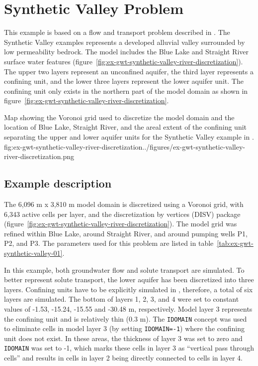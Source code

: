\section{Synthetic Valley Problem}

This example is based on a flow and transport problem described in \cite{hughes2023flopy}. The Synthetic Valley examples represents a developed alluvial valley surrounded by low permeability bedrock. The model includes the Blue Lake and Straight River surface water features (figure~\ref{fig:ex-gwt-synthetic-valley-river-discretization}). The upper two layers represent an unconfined aquifer, the third layer represents a confining unit, and the lower three layers represent the lower aquifer unit. The confining unit only exists in the northern part of the model domain as shown in figure~\ref{fig:ex-gwt-synthetic-valley-river-discretization}.

\begin{StandardFigure}{
                                     Map showing the Voronoi grid used to discretize the model domain and the location of Blue Lake, Straight River, and the areal extent of the confining unit separating the upper and lower aquifer units for the Synthetic Valley example in \cite{hughes2023flopy}.
                                     }{fig:ex-gwt-synthetic-valley-river-discretization}{../figures/ex-gwt-synthetic-valley-river-discretization.png}
\end{StandardFigure}                                 

\subsection{Example description}

The 6,096 m x 3,810 m model domain is discretized using a Voronoi grid, with 6,343 active cells per layer, and the discretization by vertices (DISV) package (figure~\ref{fig:ex-gwt-synthetic-valley-river-discretization}). The model grid was refined within Blue Lake, around Straight River, and around pumping wells P1, P2, and P3. The parameters used for this problem are listed in table~\ref{tab:ex-gwt-synthetic-valley-01}. 



In this example, both groundwater flow \citep{modflow6gwf} and solute transport \citep{modflow6gwt} are simulated. To better represent solute transport, the lower aquifer has been discretized into three layers. Confining units have to be explicitly simulated in \mf, therefore, a total of six layers are simulated. The bottom of layers 1, 2, 3, and 4 were set to constant values of -1.53, -15.24, -15.55 and -30.48 m, respectively. Model layer 3 represents the confining unit and is relatively thin (0.3 m). The \texttt{IDOMAIN} concept \citep{modflow6gwf} was used to eliminate cells in model layer 3 (by setting \texttt{IDOMAIN=-1}) where the confining unit does not exist. In these areas, the thickness of layer 3 was set to zero and \texttt{IDOMAIN} was set to -1, which marks these cells in layer 3 as ``vertical pass through cells'' and results in cells in layer 2 being directly connected to cells in layer 4.  

